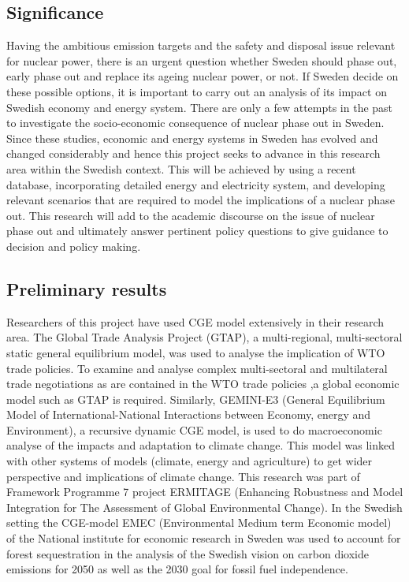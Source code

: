 \documentclass[10pt,a4paper]{article}
\begin{document}

\subsection{Significance}
Having the ambitious emission targets and the safety and disposal issue relevant for nuclear power, there is an urgent question whether Sweden should phase out, early phase out and replace its ageing nuclear power, or not. If Sweden decide on these possible options, it is important to carry out an analysis of its impact on Swedish economy and energy system. There are only a few attempts in the past to investigate the socio-economic consequence of nuclear phase out in Sweden. Since these studies, economic and energy systems in Sweden has evolved and changed considerably and hence this project seeks to advance in this research area within the Swedish context. This will be achieved by using a recent database, incorporating detailed energy and electricity system, and developing relevant scenarios that are required to model the implications of a nuclear phase out. This research will add to the academic discourse on the issue of nuclear phase out and ultimately answer pertinent policy questions to give guidance to decision and policy making.

\subsection{Preliminary results}
Researchers of this project have used CGE model extensively in their research area. The Global Trade Analysis Project (GTAP), a multi-regional, multi-sectoral static general equilibrium model, was used to analyse the implication of WTO trade policies. To examine and analyse complex multi-sectoral and multilateral trade negotiations as are contained in the WTO trade policies ,a global economic model such as GTAP is required. Similarly, GEMINI-E3 (General Equilibrium Model of International-National Interactions between Economy, energy and Environment), a recursive dynamic CGE model, is used to do macroeconomic analyse of the impacts and adaptation to climate change. This model was linked with other systems of models (climate, energy and agriculture) to get wider perspective and implications of climate change. This research was part of Framework Programme 7 project ERMITAGE (Enhancing Robustness and Model Integration for The Assessment of Global Environmental Change).
In the Swedish setting the CGE-model EMEC (Environmental Medium term Economic model) of the National institute for economic research in Sweden was used to account for forest sequestration in the analysis of the Swedish vision on carbon dioxide emissions for 2050 as well as the 2030 goal for fossil fuel independence.
\end{document}
